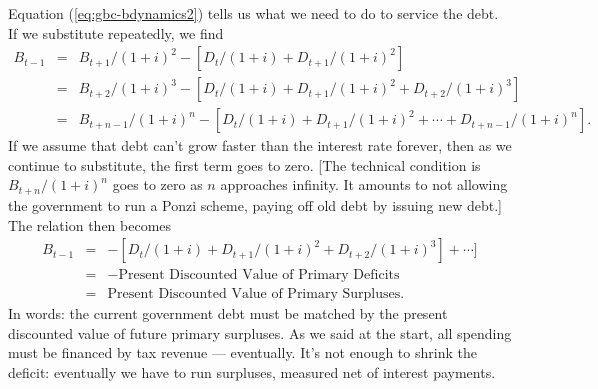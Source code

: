 \documentclass[letterpaper,12pt]{article}
\begin{document}
Equation (\ref{eq:gbc-bdynamics2}) tells us what we need to do to service
the debt.
If we substitute repeatedly, we find
\begin{eqnarray*}
    B_{t-1}   &=&  B_{t+1}/(1+i)^2 - [D_t/(1+i)+ D_{t+1}/(1+i)^2] \\
            &=&  B_{t+2}/(1+i)^3 -
                [D_t/(1+i)+ D_{t+1}/(1+i)^2 + D_{t+2}/(1+i)^3] \\
            &=&  B_{t+n-1}/(1+i)^n -
                [D_t/(1+i)+ D_{t+1}/(1+i)^2 + \cdots + D_{t+n-1}/(1+i)^n] .
\end{eqnarray*}
If we assume that debt can't grow faster than the interest rate forever,
then as we continue to substitute, the first term goes to zero.
[The technical condition is $B_{t+n}/(1+i)^n$ goes to zero as $n$
approaches infinity.
It amounts to not allowing the government to run a Ponzi scheme,
paying off old debt by issuing new debt.]
The relation then becomes
\begin{eqnarray*}
    B_{t-1}   &=&  -[D_t/(1+i)+ D_{t+1}/(1+i)^2 +
                   D_{t+2}/(1+i)^3] +   \cdots ]  \\
            &=& - \mbox{Present Discounted Value of Primary Deficits} \\
            &=& \mbox{Present Discounted Value of Primary Surpluses} .
\end{eqnarray*}
In words:   the current government debt must be matched
by the present discounted value of future primary surpluses.
As we said at the start, all spending must be financed by tax revenue --- eventually.
It's not enough to shrink the deficit:  eventually we have
to run surpluses, measured net of interest payments.



\begin{comment}
Although (primary) government deficits must eventually be reversed,
they can affect the economy while they last.
One route is distribution.
If taxes are delayed long enough, the tax burden
will be shifted from current to future generations.
Thus the US contribution to World War II was financed largely with debt,
shifting some of the burden from those alive at the time to those born later.


Is deficit financing a good or bad thing?
One approach to this question is based on tax smoothing.
As we mentioned in ``Notes on taxes,''
the economic disincentives built into taxes are minimized
by having relatively constant tax rates even if tax revenues
vary over time.
On average this is likely to lead to governments running (modest)
surpluses in booms and deficits in recessions,
as tax revenues go up and down with the economy.
\end{comment}
\end{document}
